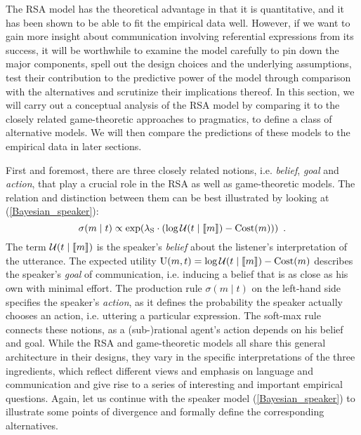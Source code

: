 The RSA model has the theoretical advantage in that it is quantitative, and it has been shown to be able to fit the empirical data well. However, if we want to gain more insight about communication involving referential expressions from its success, it will be worthwhile to examine the model carefully to pin down the major components, spell out the design choices and the underlying assumptions, test their contribution to the predictive power of the model through comparison with the alternatives and scrutinize their implications thereof. In this section, we will carry out a conceptual analysis of the RSA model by comparing it to the closely related game-theoretic approaches to pragmatics, to define a class of alternative models. We will then compare the predictions of these models to the empirical data in later sections. 

First and foremost, there are three closely related notions, i.e. \emph{belief}, \emph{goal} and \emph{action}, that play a crucial role in the RSA as well as game-theoretic models. The relation and distinction between them can be best illustrated by looking at (\ref{Bayesian_speaker}):
$$\sigma(m \mid t) \propto \exp(\lambda_\mathrm{S} \cdot (\log \mathcal{U}(t\mid \llbracket m \rrbracket)-\mbox{Cost}(m))) \enspace .$$
The term $\mathcal{U}(t\mid \llbracket m \rrbracket)$ is the speaker's \emph{belief} about the listener's interpretation of the utterance. The expected utility $\mbox{U}(m,t)=\log \mathcal{U}(t\mid \llbracket m \rrbracket)-\mbox{Cost}(m)$ describes the speaker's \emph{goal} of communication, i.e. inducing a belief that is as close as his own with minimal effort. The production rule $\sigma(m \mid t)$ on the left-hand side specifies the speaker's \emph{action}, as it defines the probability the speaker actually chooses an action, i.e. uttering a particular expression. The soft-max rule connects these notions, as a (sub-)rational agent's action depends on his belief and goal. While the RSA and game-theoretic models all share this general architecture in their designs, they vary in the specific interpretations of the three ingredients, which reflect different views and emphasis on language and communication and give rise to a series of interesting and important empirical questions. Again, let us continue with the speaker model (\ref{Bayesian_speaker}) to illustrate some points of divergence and formally define the corresponding alternatives.

